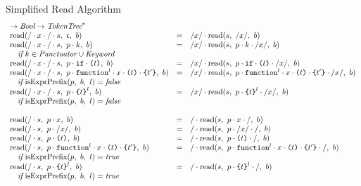 \documentclass[preprint,10pt]{sigplanconf}
\begin{document}
\begin{displayfigure*}{\label{fig:simpleread}Simplified Read Algorithm}
\[\begin{array}{lcll}
{      \rightarrow \textit{Bool} \rightarrow \textit{TokenTree}^{*}}
    \\
    \textrm{read}(/\cdot x \cdot /\cdot s,~\epsilon,~b)
    &=&
    /x/ \cdot 
      \textrm{read}(s,~/x/,~b)
   
    \\
    \textrm{read}(/\cdot x \cdot /\cdot s,~p \cdot k,~b)
    &=&
    /x/ \cdot 
      \textrm{read}(s,~
        p \cdot k \cdot /x/
      ,~b)
   
    \\
    \quad\textit{if}~k \in \textit{Punctuator} \cup \textit{Keyword}
    \\
    \textrm{read}(/\cdot x \cdot /\cdot s,~
      p \cdot \texttt{if} \cdot \texttt{(}t\texttt{)}
    ,~b)
    &=&
    /x/ \cdot 
      \textrm{read}(s,~p \cdot \texttt{if} \cdot \texttt{(}t\texttt{)} \cdot /x/,~b)
   
    \\
    \textrm{read}(/\cdot x \cdot /\cdot s,~
      p \cdot \texttt{function}^{l} \cdot x
      \cdot \texttt{(}t\texttt{)} \cdot \texttt{\{}t'\texttt{\}}
    ,~b)
    &=&
    /x/ \cdot 
      \textrm{read}(s,~
      p 
      \cdot \texttt{function}^{l} \cdot x \cdot 
      \texttt{(}t\texttt{)} \cdot \texttt{\{}t'\texttt{\}}\cdot /x/
      ,~b)
    \\
    \quad \textit{if}~\textrm{isExprPrefix}(p,~b,~l) = \textit{false}
    \\
    \textrm{read}(/\cdot x \cdot / \cdot s,~
      p \cdot \texttt{\{}t\texttt{\}}^{l}
    ,~b)
    &=&
    /x/ \cdot 
      \textrm{read}(s,~
        p \cdot \texttt{\{}t\texttt{\}}^{l}\cdot /x/
      ,~b)
   
    \\
    \quad \textit{if}~ \textrm{isExprPrefix}(p,~b,~l) = \textit{false}

    \\ \\

    \textrm{read}(/\cdot s,~p\cdot x,~b)
    &=&
    / \cdot 
      \textrm{read}(s,~
        p\cdot x\cdot /
      ,~b)
   
    \\
    \textrm{read}(/\cdot s,~p \cdot /x/,~b)
    &=&
    / \cdot 
      \textrm{read}(s,~
        p \cdot /x/ \cdot /
      ,~b)
   
    \\
    \textrm{read}(/\cdot s,~p \cdot \texttt{(}t\texttt{)},~b)
    &=&
    / \cdot 
      \textrm{read}(s,~
        p \cdot \texttt{(}t\texttt{)} \cdot /
      ,~b)
   
    \\
    \textrm{read}(/\cdot s,~
      p  \cdot \texttt{function}^l \cdot x
      \cdot \texttt{(}t\texttt{)} \cdot \texttt{\{}t'\texttt{\}}
    ,~b)
    &=&
    / \cdot 
      \textrm{read}(s,~
        p  \cdot \texttt{function}^l \cdot x \cdot \texttt{(}t\texttt{)}
        \cdot \texttt{\{}t'\texttt{\}} \cdot /
      ,~b)
   
    \\
    \quad \textit{if}~\textrm{isExprPrefix}(p,~b,~l)= \textit{true}
    \\
    \textrm{read}(/\cdot s,~
      p \cdot \texttt{\{}t\texttt{\}}^{l}
    ,~b)
    &=&
    / \cdot 
      \textrm{read}(s,~
        p \cdot \texttt{\{}t\texttt{\}}^{l} \cdot /
      ,~b)
   
    \\
    \quad \textit{if}~\textrm{isExprPrefix}(p,~b,~l)= \textit{true}


\end{array}\]
\end{displayfigure*}
\end{document}
